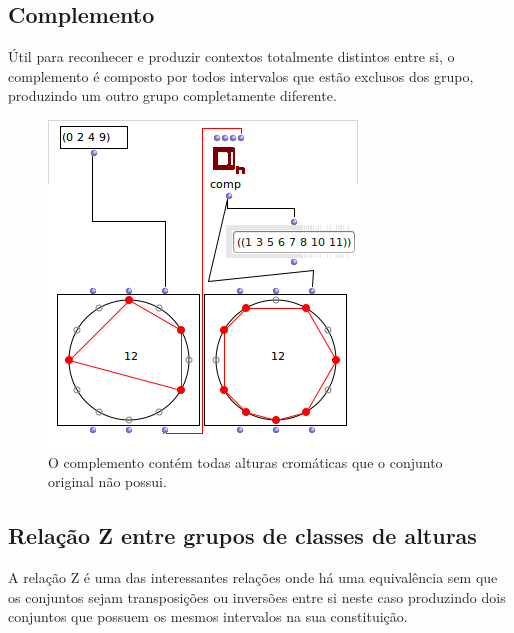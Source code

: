 \documentclass[
	12pt,				%
	openright,			%
	twoside,			%
	a4paper,			%
	english,			%
	french,				%
	spanish,			%
	brazil				%
	]{abntex2}
\begin{document}
\begin{apendicesenv}
\subsection{Complemento}

Útil para reconhecer e produzir contextos totalmente distintos entre si, o complemento é composto por todos intervalos que estão exclusos dos grupo, produzindo um outro grupo completamente diferente.


\begin{figure}[!h]
	\caption{\label{fig_grafico}O complemento contém todas alturas cromáticas que o conjunto original não possui. }
	\begin{center}
	    \includegraphics[scale=0.6]{OM_settheory/complemento.png}
	\end{center}
\end{figure}


\subsection{Relação Z entre grupos de classes de alturas}

A relação Z é uma das interessantes relações onde há uma equivalência sem que os conjuntos sejam transposições ou inversões entre si neste caso produzindo dois conjuntos que possuem os mesmos intervalos na sua constituição.



\end{apendicesenv}
\end{document}
